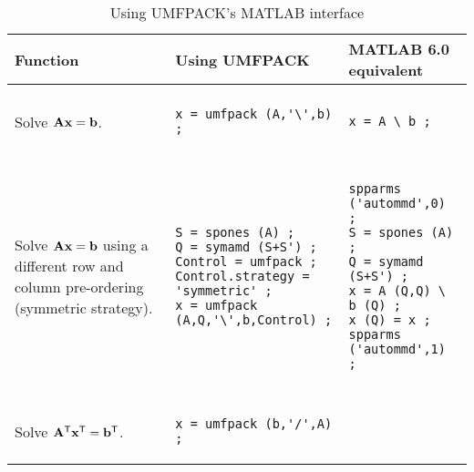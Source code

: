 \documentclass[11pt]{article}
\newcommand{\m}[1]{{\bf{#1}}}       %
\newcommand{\tr}{^{\sf T}}          %
\begin{document}
\begin{table}
\caption{Using UMFPACK's MATLAB interface}
\label{matlab}
\vspace{0.1in}
{\footnotesize
\begin{tabular}{l|l|l}
\hline
Function & Using UMFPACK & MATLAB 6.0 equivalent \\
\hline
 & & \\
\begin{minipage}[t]{1.5in}
Solve $\m{Ax}=\m{b}$.
\end{minipage}
&
\begin{minipage}[t]{2.2in}
\begin{verbatim}
x = umfpack (A,'\',b) ;
\end{verbatim}
\end{minipage}
&
\begin{minipage}[t]{2.2in}
\begin{verbatim}
x = A \ b ;
\end{verbatim}
\end{minipage}
 \\
 & & \\
\hline
 & & \\
\begin{minipage}[t]{1.5in}
Solve $\m{Ax}=\m{b}$ using a different row and column pre-ordering
(symmetric strategy).
\end{minipage}
&
\begin{minipage}[t]{2.2in}
\begin{verbatim}
S = spones (A) ;
Q = symamd (S+S') ;
Control = umfpack ;
Control.strategy = 'symmetric' ;
x = umfpack (A,Q,'\',b,Control) ;
\end{verbatim}
\end{minipage}
&
\begin{minipage}[t]{2.2in}
\begin{verbatim}
spparms ('autommd',0) ;
S = spones (A) ;
Q = symamd (S+S') ;
x = A (Q,Q) \ b (Q) ;
x (Q) = x ;
spparms ('autommd',1) ;
\end{verbatim}
\end{minipage}
 \\
 & & \\
\hline
 & & \\
\begin{minipage}[t]{1.5in}
Solve $\m{A}\tr\m{x}\tr = \m{b}\tr$.
\end{minipage}
&
\begin{minipage}[t]{2.2in}
\begin{verbatim}
x = umfpack (b,'/',A) ;
\end{verbatim}

\end{minipage}
\end{tabular}}
\end{table}
\end{document}
